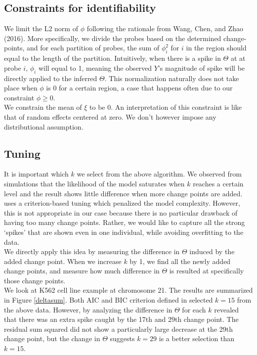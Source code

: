 \documentclass[11pt]{article}
\begin{document}
\subsection{Constraints for identifiability}
\noindent We limit the L2 norm of $\phi$ following the rationale from Wang, Chen, and Zhao (2016). More specifically, we divide the probes based on the determined change-points, and for each partition of probes, the sum of $\phi_i^2$ for $i$ in the region should equal to the length of the partition. Intuitively, when there is a spike in $\Theta$ at at probe $i$, $\phi_i$ will equal to 1, meaning the observed $Y$'s magnitude of spike will be directly applied to the inferred $\Theta$. This normalization naturally does not take place when $\phi$ is 0 for a certain region, a case that happens often due to our constraint $\phi \geq 0$. \\

\noindent We constrain the mean of $\xi$ to be 0. An interpretation of this constraint is like that of random effects centered at zero. We don't however impose any distributional assumption.

\subsection{Tuning}

\noindent It is important which $k$ we select from the above algorithm. We observed from simulations that the likelihood of the model saturates when $k$ reaches a certain level and the result shows little difference when more change points are added. \cite{wang2016estimating} uses a criterion-based tuning which penalized the model complexity. However, this is not appropriate in our case because there is no particular drawback of having too many change points. Rather, we would like to capture all the strong `spikes' that are shown even in one individual, while avoiding overfitting to the data. \\

\noindent We directly apply this idea by measuring the difference in $\Theta$ induced by the added change point. When we increase $k$ by 1, we find all the newly added change points, and measure how much difference in $\Theta$ is resulted at specifically those change points.  \\

\noindent We look at K562 cell line example at chromosome 21. The results are summarized in Figure \ref{deltasum}.  Both AIC and BIC criterion defined in \cite{wang2016estimating} selected $k=15$ from the above data. However, by analyzing the difference in $\Theta$ for each $k$ revealed that there was an extra spike caught by the 17th and 29th change point. The residual sum squared did not show a particularly large decrease at the 29th change point, but the change in $\Theta$ suggests $k=29$ is a better selection than $k=15$.
\end{document}
